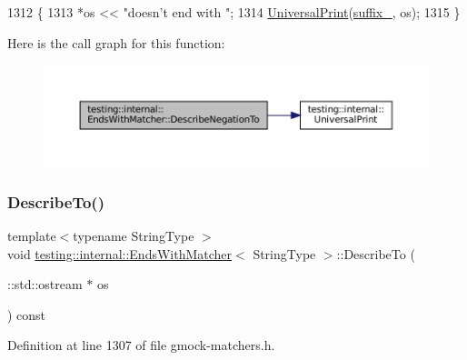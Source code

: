 \begin{DoxyCode}
1312                                                 \{
1313     *os << \textcolor{stringliteral}{"doesn't end with "};
1314     \hyperlink{namespacetesting_1_1internal_a30708fa2bacf11895b03bdb21eb72309}{UniversalPrint}(\hyperlink{classtesting_1_1internal_1_1EndsWithMatcher_a66f75082cf1041cd328c01b47acf8350}{suffix\_}, os);
1315   \}
\end{DoxyCode}
Here is the call graph for this function\+:
\nopagebreak
\begin{figure}[H]
\begin{center}
\leavevmode
\includegraphics[width=350pt]{classtesting_1_1internal_1_1EndsWithMatcher_af5dd55c6c3a2ce57bd85f12e07cb604a_cgraph}
\end{center}
\end{figure}
\mbox{\label{classtesting_1_1internal_1_1EndsWithMatcher_aec33451ab09428a97ab0793e332416d8}} 
\subsubsection{\texorpdfstring{Describe\+To()}{DescribeTo()}}
{\footnotesize\ttfamily template$<$typename String\+Type $>$ \\
void \hyperlink{classtesting_1_1internal_1_1EndsWithMatcher}{testing\+::internal\+::\+Ends\+With\+Matcher}$<$ String\+Type $>$\+::Describe\+To (\begin{DoxyParamCaption}\item[{\+::std\+::ostream $\ast$}]{os }\end{DoxyParamCaption}) const\hspace{0.3cm}{\ttfamily [inline]}}



Definition at line 1307 of file gmock-\/matchers.\+h.



